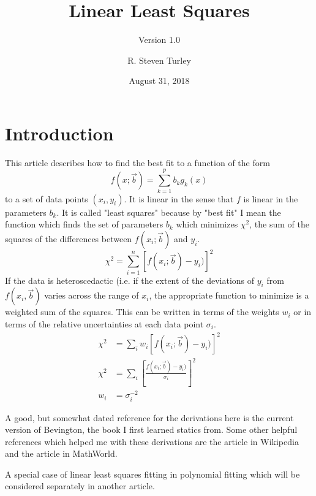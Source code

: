 \documentclass{scrartcl}
\title{Linear Least Squares}
\subtitle{Version 1.0}
\author{R. Steven Turley}
\date{August 31, 2018}
\begin{document}
\maketitle
\tableofcontents

\section{Introduction}
This article describes how to find the best fit to a function
of the form
\begin{equation}
f(x;\vec{b})=\sum_{k=1}^{p} b_k g_k(x)\label{eq:lin}
\end{equation}
to a set of data points $(x_i,y_i)$.
It is linear in the sense that $f$ is linear in the parameters
$b_k$. It is called "least squares" because by "best fit" I
mean the function which finds the set
of parameters $b_k$ which minimizes $\chi^2$, the sum of the squares of
the differences between $f(x_i;\vec{b})$ and $y_i$.
\begin{equation}
\chi^2 = \sum_{i=1}^n [f(x_i;\vec{b})-y_i)]^2\label{eq:uwchi}
\end{equation}
If the data is heteroscedactic (i.e. if the extent of the deviations
of $y_i$ from $f(x_i,\vec{b})$ varies across the range of $x_i$, 
the appropriate function to minimize is a weighted sum of the squares.
This can be written in terms of the weights $w_i$ or in terms of the
relative uncertainties at each data point $\sigma_i$.
\begin{align}
\chi^2 &= \sum_i w_i[f(x_i;\vec{b})-y_i)]^2\label{eq:wchi}\\
\chi^2 &= \sum_i \left[\frac{f(x_i;\vec{b})-y_i)}{\sigma_i}\right]^2
	\label{eq:schi}\\
w_i &= \sigma_i^{-2}\label{eq:ws}
\end{align}

A good, but somewhat dated reference for the derivations here
is the current version of Bevington\cite{Bevington},
the book I first learned statics from. Some other helpful references
which helped me with these derivations are the article
in Wikipedia\cite{Wikipedia} and the article in
MathWorld\cite{MathWorld}.

A special case of linear least squares fitting in polynomial fitting
which will be considered separately in another article\cite{polyfit}.
\end{document}

